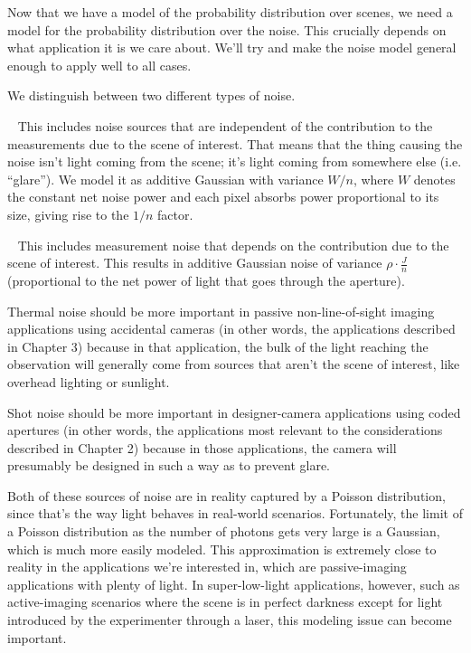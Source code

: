 Now that we have a model of the probability distribution over scenes, we need a model for the probability distribution over the noise. This crucially depends on what application it is we care about. We'll try and make the noise model general enough to apply well to all cases.

We distinguish between two different types of noise.

~
This includes noise sources that are independent of the contribution to the measurements due to the scene of interest. That means that the thing causing the noise isn't light coming from the scene; it's light coming from somewhere else (i.e. ``glare''). We model it as additive Gaussian with variance $W/n$, where $W$ denotes the constant net noise power and each pixel absorbs power proportional to its size, giving rise to the $1/n$ factor. 

~
This includes measurement noise that depends on the contribution due to the scene of interest. This results in additive Gaussian noise of variance  $\rho\cdot\frac{J}{n}$ (proportional to the net power of light that goes through the aperture). 

Thermal noise should be more important in passive non-line-of-sight imaging applications using accidental cameras (in other words, the applications described in Chapter 3) because in that application, the bulk of the light reaching the observation will generally come from sources that aren't the scene of interest, like overhead lighting or sunlight.

Shot noise should be more important in designer-camera applications using coded apertures (in other words, the applications most relevant to the considerations described in Chapter 2) because in those applications, the camera will presumably be designed in such a way as to prevent glare.

Both of these sources of noise are in reality captured by a Poisson distribution, since that's the way light behaves in real-world scenarios. Fortunately, the limit of a Poisson distribution as the number of photons gets very large is a Gaussian, which is much more easily modeled. This approximation is extremely close to reality in the applications we're interested in, which are passive-imaging applications with plenty of light. In super-low-light applications, however, such as active-imaging scenarios where the scene is in perfect darkness except for light introduced by the experimenter through a laser, this modeling issue can become important.

